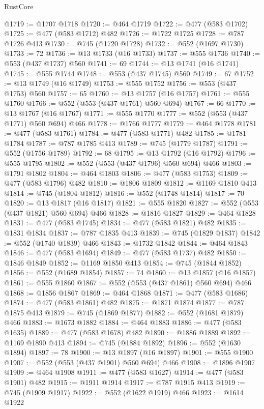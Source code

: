 \begin{lexlean}{RustCore}
\begin{coremodule}
@1719 := @1707 @1718
@1720 := @464 @1719
@1722 := @477 (@583 @1702)
@1725 := @477 (@583 @1712) @482
@1726 := @1722 @1725
@1728 := @787 @1726 @413
@1730 := @745 (@1720 @1728)
@1732 := @552 (@1697 @1730)
@1733 := 72
@1736 := @13 @1733 (@16 @1733)
@1737 := @555 @1736
@1740 := @553 (@437 @1737) @560
@1741 := 69
@1744 := @13 @1741 (@16 @1741)
@1745 := @555 @1744
@1748 := @553 (@437 @1745) @560
@1749 := 67
@1752 := @13 @1749 (@16 @1749)
@1753 := @555 @1752
@1756 := @553 (@437 @1753) @560
@1757 := 65
@1760 := @13 @1757 (@16 @1757)
@1761 := @555 @1760
@1766 := @552 (@553 (@437 @1761) @560 @694)
@1767 := 66
@1770 := @13 @1767 (@16 @1767)
@1771 := @555 @1770
@1777 := @552 (@553 (@437 @1771) @560 @694) @466
@1778 := @1766 @1777
@1779 := @464 @1778
@1781 := @477 (@583 @1761)
@1784 := @477 (@583 @1771) @482
@1785 := @1781 @1784
@1787 := @787 @1785 @413
@1789 := @745 (@1779 @1787)
@1791 := @552 (@1756 @1789)
@1792 := 68
@1795 := @13 @1792 (@16 @1792)
@1796 := @555 @1795
@1802 := @552 (@553 (@437 @1796) @560 @694) @466
@1803 := @1791 @1802
@1804 := @464 @1803
@1806 := @477 (@583 @1753)
@1809 := @477 (@583 @1796) @482
@1810 := @1806 @1809
@1812 := @1169 @1810 @413
@1814 := @745 (@1804 @1812)
@1816 := @552 (@1748 @1814)
@1817 := 70
@1820 := @13 @1817 (@16 @1817)
@1821 := @555 @1820
@1827 := @552 (@553 (@437 @1821) @560 @694) @466
@1828 := @1816 @1827
@1829 := @464 @1828
@1831 := @477 (@583 @1745)
@1834 := @477 (@583 @1821) @482
@1835 := @1831 @1834
@1837 := @787 @1835 @413
@1839 := @745 (@1829 @1837)
@1842 := @552 (@1740 @1839) @466
@1843 := @1732 @1842
@1844 := @464 @1843
@1846 := @477 (@583 @1694)
@1849 := @477 (@583 @1737) @482
@1850 := @1846 @1849
@1852 := @1169 @1850 @413
@1854 := @745 (@1844 @1852)
@1856 := @552 (@1689 @1854)
@1857 := 74
@1860 := @13 @1857 (@16 @1857)
@1861 := @555 @1860
@1867 := @552 (@553 (@437 @1861) @560 @694) @466
@1868 := @1856 @1867
@1869 := @464 @1868
@1871 := @477 (@583 @1686)
@1874 := @477 (@583 @1861) @482
@1875 := @1871 @1874
@1877 := @787 @1875 @413
@1879 := @745 (@1869 @1877)
@1882 := @552 (@1681 @1879) @466
@1883 := @1673 @1882
@1884 := @464 @1883
@1886 := @477 (@583 @1635)
@1889 := @477 (@583 @1678) @482
@1890 := @1886 @1889
@1892 := @1169 @1890 @413
@1894 := @745 (@1884 @1892)
@1896 := @552 (@1630 @1894)
@1897 := 78
@1900 := @13 @1897 (@16 @1897)
@1901 := @555 @1900
@1907 := @552 (@553 (@437 @1901) @560 @694) @466
@1908 := @1896 @1907
@1909 := @464 @1908
@1911 := @477 (@583 @1627)
@1914 := @477 (@583 @1901) @482
@1915 := @1911 @1914
@1917 := @787 @1915 @413
@1919 := @745 (@1909 @1917)
@1922 := @552 (@1622 @1919) @466
@1923 := @1614 @1922

\end{coremodule}
\end{lexlean}
